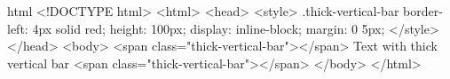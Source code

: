 html
<!DOCTYPE html>
<html>
<head>
    <style>
        .thick-vertical-bar {
            border-left: 4px solid red;
            height: 100px;
            display: inline-block;
            margin: 0 5px;
        }
    </style>
</head>
<body>
    <span class="thick-vertical-bar"></span>
    Text with thick vertical bar
    <span class="thick-vertical-bar"></span>
</body>
</html>